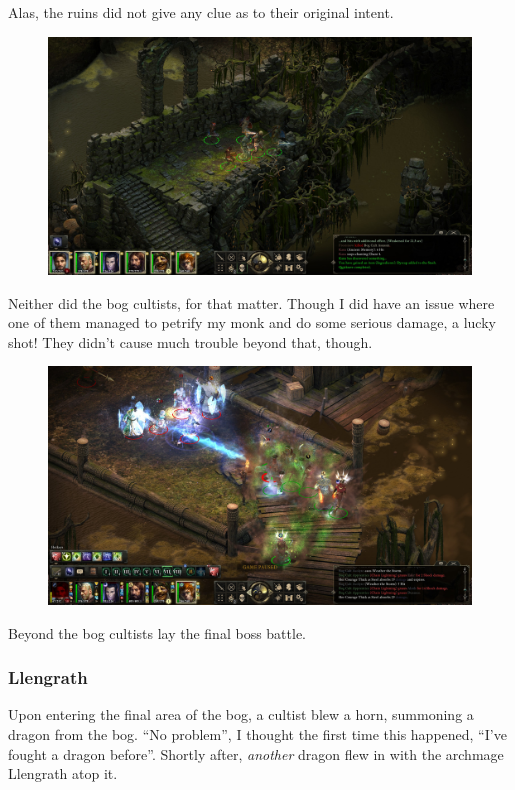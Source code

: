 \documentclass{article}
\begin{document}
Alas, the ruins did not give any clue as to their original intent.

\begin{figure}
\includegraphics[scale=0.33]{files/blog/2020_01_18_poe_potd_wmpt2/2020_01_18_bog3.jpg}
\end{figure}

Neither did the bog cultists, for that matter.  Though I did have an issue where one of them managed to petrify my monk and do some serious damage, a lucky shot!  They didn't cause much trouble beyond that, though.

\begin{figure}
\includegraphics[scale=0.33]{files/blog/2020_01_18_poe_potd_wmpt2/2020_01_18_bog4.jpg}
\end{figure}

Beyond the bog cultists lay the final boss battle.

\subsubsection{Llengrath}
Upon entering the final area of the bog, a cultist blew a horn, summoning a dragon from the bog.  ``No problem'', I thought the first time this happened, ``I've fought a dragon before''.  Shortly after, \emph{another} dragon flew in with the archmage Llengrath atop it.
\end{document}
